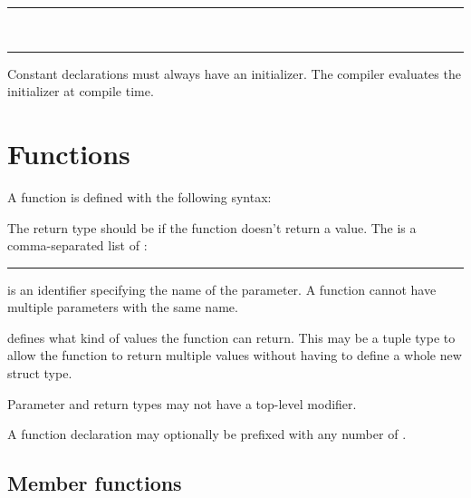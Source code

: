 \begin{grammar}
\rule{implicitly-typed-constant-definition}   \code{=}  \code{;}\\
\rule{explicitly-typed-constant-definition}    \code{=}  \code{;}
\end{grammar}

Constant declarations must always have an initializer. The compiler evaluates the initializer at compile time.

\section{Functions}

A function is defined with the following syntax:

\begin{grammar}
  \code{(}  \code{)} \code{\{}  \code{\}}
\end{grammar}

The return type should be  if the function doesn't return a value. The
 is a comma-separated list of
:

\begin{grammar}
\rule{parameter}  
\end{grammar}

 is an identifier specifying the name of the
parameter. A function cannot have multiple parameters with the same name.

 defines what kind of values the function can return.
This may be a tuple type to allow the function to return multiple values without
having to define a whole new struct type.

Parameter and return types may not have a top-level  modifier.

A function declaration may optionally be prefixed with any number of
\hyperref[sec:function-specifiers]{}.

\subsection{Member functions}

